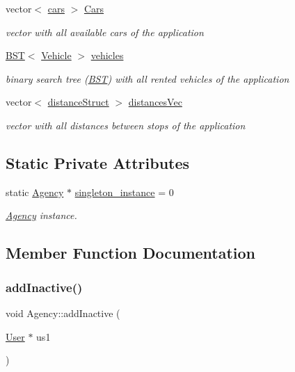 \begin{Indent}
\begin{DoxyCompactItemize}
vector$<$ \hyperlink{structcars}{cars} $>$ \hyperlink{group___agency_ga2fc5f0f3c78faed2a20b3dbcf276a730}{Cars}
\begin{DoxyCompactList}\small\item\em vector with all available cars of the application \end{DoxyCompactList}\item 
\hyperlink{class_b_s_t}{B\+ST}$<$ \hyperlink{class_vehicle}{Vehicle} $>$ \hyperlink{group___agency_gaacec2af5f5b458ab7103225e07b780cf}{vehicles}
\begin{DoxyCompactList}\small\item\em binary search tree (\hyperlink{class_b_s_t}{B\+ST}) with all rented vehicles of the application \end{DoxyCompactList}\item 
vector$<$ \hyperlink{structdistance_struct}{distance\+Struct} $>$ \hyperlink{group___agency_ga53eb5336f6197d5643f9489f2efc0467}{distances\+Vec}
\begin{DoxyCompactList}\small\item\em vector with all distances between stops of the application \end{DoxyCompactList}\end{DoxyCompactItemize}
\end{Indent}
\subsection*{Static Private Attributes}
\begin{DoxyCompactItemize}
\item 
static \hyperlink{class_agency}{Agency} $\ast$ \hyperlink{group___agency_ga24c6ae11e29cdf5eefc6a5c94783b90e}{singleton\+\_\+instance} = 0
\begin{DoxyCompactList}\small\item\em \hyperlink{class_agency}{Agency} instance. \end{DoxyCompactList}\end{DoxyCompactItemize}


\subsection{Member Function Documentation}
\mbox{\label{class_agency_aca43b6ff4d5b43aae73779cf271ac0fe}} 
\subsubsection{\texorpdfstring{add\+Inactive()}{addInactive()}}
{\footnotesize\ttfamily void Agency\+::add\+Inactive (\begin{DoxyParamCaption}\item[{\hyperlink{class_user}{User} $\ast$}]{us1 }\end{DoxyParamCaption})}



